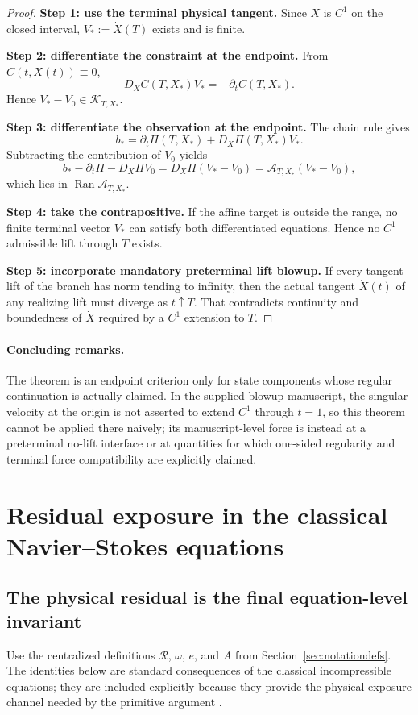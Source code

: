 \documentclass[12pt]{article}
\newcommand{\Rres}{\mathcal R}
\newcommand{\Ran}{\operatorname{Ran}}
\newcommand{\Kt}{\mathcal K}
\newcommand{\Comp}{\mathscr A}
\begin{document}
\begin{proof}
\textbf{Step 1: use the terminal physical tangent.}
Since $X$ is $C^1$ on the closed interval, $V_*:=\dot X(T)$ exists and is finite.

\textbf{Step 2: differentiate the constraint at the endpoint.}
From $C(t,X(t))\equiv0$,
\[
D_XC(T,X_*)V_*=-\partial_tC(T,X_*).
\]
Hence $V_*-V_0\in\Kt_{T,X_*}$.

\textbf{Step 3: differentiate the observation at the endpoint.}
The chain rule gives
\[
b_*=\partial_t\Pi(T,X_*)+D_X\Pi(T,X_*)V_*.
\]
Subtracting the contribution of $V_0$ yields
\[
 b_*-\partial_t\Pi-D_X\Pi V_0
 =D_X\Pi(V_*-V_0)
 =\Comp_{T,X_*}(V_*-V_0),
\]
which lies in $\Ran\Comp_{T,X_*}$.

\textbf{Step 4: take the contrapositive.}
If the affine target is outside the range, no finite terminal vector $V_*$ can satisfy both differentiated equations. Hence no $C^1$ admissible lift through $T$ exists.

\textbf{Step 5: incorporate mandatory preterminal lift blowup.}
If every tangent lift of the branch has norm tending to infinity, then the actual tangent $\dot X(t)$ of any realizing lift must diverge as $t\uparrow T$. That contradicts continuity and boundedness of $\dot X$ required by a $C^1$ extension to $T$.
\end{proof}

\paragraph{Concluding remarks.}
The theorem is an endpoint criterion only for state components whose regular continuation is actually claimed. In the supplied blowup manuscript, the singular velocity at the origin is not asserted to extend $C^1$ through $t=1$, so this theorem cannot be applied there naively; its manuscript-level force is instead at a preterminal no-lift interface or at quantities for which one-sided regularity and terminal force compatibility are explicitly claimed.
\section{Residual exposure in the classical Navier--Stokes equations}
\subsection{The physical residual is the final equation-level invariant}
Use the centralized definitions $\Rres$, $\omega$, $e$, and $A$ from Section~\ref{sec:notationdefs}. The identities below are standard consequences of the classical incompressible equations; they are included explicitly because they provide the physical exposure channel needed by the primitive argument \cite{Temam,ConstantinFoias,MajdaBertozzi,RobinsonRodrigoSadowski}.
\end{document}
